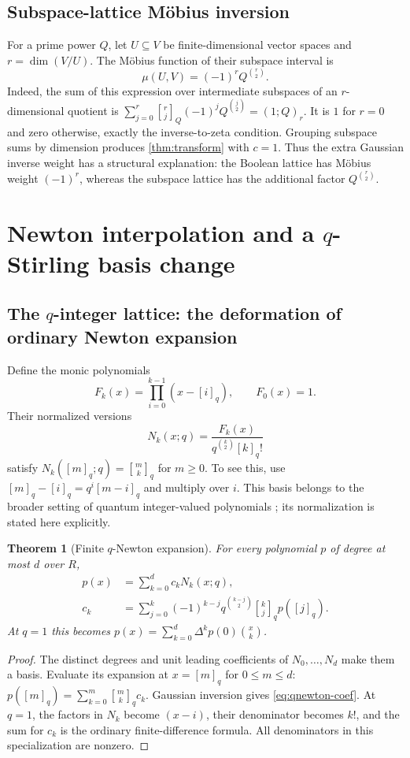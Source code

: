 \documentclass[11pt,a4paper]{article}
\numberwithin{equation}{section}
\newtheorem{theorem}{Theorem}[section]
\theoremstyle{definition}
\theoremstyle{remark}
\newcommand{\qb}[2]{\genfrac{[}{]}{0pt}{}{#1}{#2}_{q}}
\newcommand{\qbb}[3]{\genfrac{[}{]}{0pt}{}{#1}{#2}_{#3}}
\newcommand{\qf}[1]{[#1]_{q}!}
\newcommand{\qi}[1]{[#1]_{q}}
\newcommand{\poch}[3]{(#1;#2)_{#3}}
\begin{document}
\subsection{Subspace-lattice M\"obius inversion}
For a prime power $Q$, let $U\subseteq V$ be finite-dimensional vector spaces and
$r=\dim(V/U)$. The M\"obius function of their subspace interval is
\begin{equation}\label{eq:subspace-mobius}
 \mu(U,V)=(-1)^r Q^{\binom r2}.
\end{equation}
Indeed, the sum of this expression over intermediate subspaces of an
$r$-dimensional quotient is
$\sum_{j=0}^r\qbb rjQ(-1)^jQ^{\binom j2}=\poch1Qr$.
It is $1$ for $r=0$ and zero otherwise, exactly the inverse-to-zeta condition.
Grouping subspace sums by dimension produces \cref{thm:transform} with $c=1$.
Thus the extra Gaussian inverse weight has a structural explanation: the Boolean
lattice has M\"obius weight $(-1)^r$, whereas the subspace lattice has the additional
factor $Q^{\binom r2}$.

\section{Newton interpolation and a \texorpdfstring{$q$}{q}-Stirling basis change}\label{sec:newton}

\subsection{The \texorpdfstring{$q$}{q}-integer lattice: the deformation of ordinary Newton expansion}
Define the monic polynomials
\begin{equation}\label{eq:Fk}
 F_k(x)=\prod_{i=0}^{k-1}(x-\qi i),\qquad F_0(x)=1.
\end{equation}
Their normalized versions
\[
 N_k(x;q)=\frac{F_k(x)}{q^{\binom k2}\qf k}
\]
satisfy $N_k(\qi m;q)=\qb mk$ for $m\ge0$. To see this, use
$\qi m-\qi i=q^i\qi{m-i}$ and multiply over $i$.
This basis belongs to the broader setting of quantum integer-valued polynomials
\cite{HarmanHopkins}; its normalization is stated here explicitly.

\begin{theorem}[Finite $q$-Newton expansion]\label{thm:qnewton}
For every polynomial $p$ of degree at most $d$ over $R$,
\begin{align}
 p(x)&=\sum_{k=0}^d c_k N_k(x;q),\label{eq:qnewton}\\
 c_k&=\sum_{j=0}^k(-1)^{k-j}q^{\binom{k-j}2}\qb kj p(\qi j).
 \label{eq:qnewton-coef}
\end{align}
At $q=1$ this becomes
$p(x)=\sum_{k=0}^d\Delta^kp(0)\binom xk$.
\end{theorem}
\begin{proof}
The distinct degrees and unit leading coefficients of $N_0,\ldots,N_d$ make
them a basis. Evaluate its expansion at $x=\qi m$ for $0\le m\le d$:
$p(\qi m)=\sum_{k=0}^m\qb mk c_k$. Gaussian inversion gives
\eqref{eq:qnewton-coef}. At $q=1$, the factors in $N_k$ become
$(x-i)$, their denominator becomes $k!$, and the sum for $c_k$ is the ordinary
finite-difference formula. All denominators in this specialization are nonzero.
\end{proof}
\end{document}

